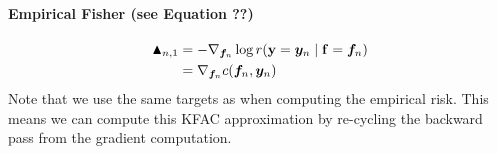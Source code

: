 \paragraph{Empirical Fisher (see Equation ??)}
\begin{align*}
  \blacktriangle_{n,1}
  &= -\nabla_{{\bm{f}}_n} \log r({\mathbf{y}}={\bm{y}}_n \mid {\mathbf{f}} = {\bm{f}}_n)
  \\
  &= \nabla_{{\bm{f}}_n}  c({\bm{f}}_n, {\bm{y}}_n)
\end{align*}
Note that we use the same targets as when computing the empirical risk.
This means we can compute this KFAC approximation by re-cycling the backward pass from the gradient computation.


